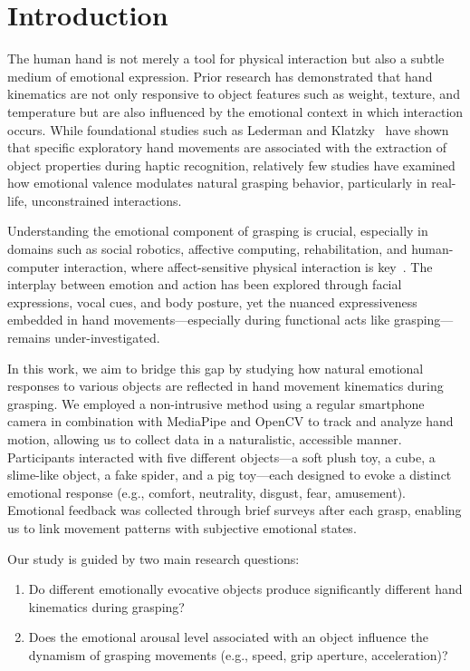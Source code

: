 \documentclass[conference]{IEEEtran}
\begin{document}
\section{Introduction}

The human hand is not merely a tool for physical interaction but also a subtle medium of emotional expression. Prior research has demonstrated that hand kinematics are not only responsive to object features such as weight, texture, and temperature but are also influenced by the emotional context in which interaction occurs. While foundational studies such as Lederman and Klatzky~\cite{b1} have shown that specific exploratory hand movements are associated with the extraction of object properties during haptic recognition, relatively few studies have examined how emotional valence modulates natural grasping behavior, particularly in real-life, unconstrained interactions.

Understanding the emotional component of grasping is crucial, especially in domains such as social robotics, affective computing, rehabilitation, and human-computer interaction, where affect-sensitive physical interaction is key~\cite{affective_haptics2023}. The interplay between emotion and action has been explored through facial expressions, vocal cues, and body posture, yet the nuanced expressiveness embedded in hand movements---especially during functional acts like grasping---remains under-investigated.

In this work, we aim to bridge this gap by studying how natural emotional responses to various objects are reflected in hand movement kinematics during grasping. We employed a non-intrusive method using a regular smartphone camera in combination with MediaPipe and OpenCV to track and analyze hand motion, allowing us to collect data in a naturalistic, accessible manner. Participants interacted with five different objects---a soft plush toy, a cube, a slime-like object, a fake spider, and a pig toy---each designed to evoke a distinct emotional response (e.g., comfort, neutrality, disgust, fear, amusement). Emotional feedback was collected through brief surveys after each grasp, enabling us to link movement patterns with subjective emotional states.

Our study is guided by two main research questions:

\begin{enumerate}
    \item Do different emotionally evocative objects produce significantly different hand kinematics during grasping?
    \item Does the emotional arousal level associated with an object influence the dynamism of grasping movements (e.g., speed, grip aperture, acceleration)?
\end{enumerate}
\end{document}
